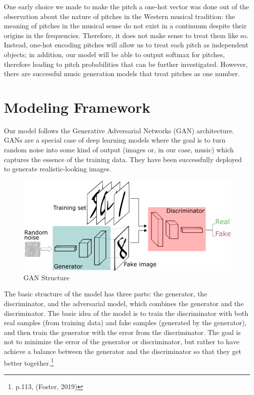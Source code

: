 \documentclass[12pt,oneside]{chicagocapstone}
\begin{document}
One early choice we made to make the pitch a one-hot vector was done out of the observation about the nature of pitches in the Western musical tradition: the meaning of pitches in the musical sense do not exist in a continuum despite their origins in the frequencies. Therefore, it does not make sense to treat them like so. Instead, one-hot encoding pitches will allow us to treat each pitch as independent objects; in addition, our model will be able to output softmax for pitches, therefore leading to pitch probabilities that can be further investigated. However, there are successful music generation models that treat pitches as one number.

\newpage

\hypertarget{methodology-modeling}{%
\section*{Modeling Framework}\label{methodology-modeling}}

Our model follows the Generative Adversarial Networks (GAN) architecture. GANs are a special case of deep learning models where the goal is to turn random noise into some kind of output (images or, in our case, music) which captures the essence of the training data. They have been successfully deployed to generate realistic-looking images.
\begin{figure}

{\centering \includegraphics[width=0.8\linewidth]{figure/GAN_structure} 

}

\caption{GAN Structure}\label{fig:unnamed-chunk-4}
\end{figure}
The basic structure of the model has three parts: the generator, the discriminator, and the adversarial model, which combines the generator and the discriminator. The basic idea of the model is to train the discriminator with both real samples (from training data) and fake samples (generated by the generator), and then train the generator with the error from the discriminator. The goal is not to minimize the error of the generator or discriminator, but rather to have achieve a balance between the generator and the discriminator so that they get better together.\footnote{p.113, (Foster, 2019)}
\end{document}
